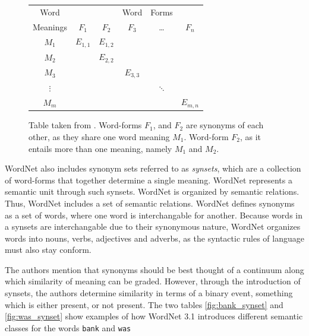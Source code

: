 \documentclass[a4paper,12pt,twoside,openright]{report}
\begin{document}
\begin{figure}
\begin{center}
\begin{tabular}{ | c | c  c  c  c  c | } 
 \hline
 Word        &  &  & Word & Forms &  \\ 
 Meanings & $F_1$ & $F_2$ & $F_3$ & \ldots & $F_n$ \\ 
 \hline
 $M_1$     & $E_{1,1}$ & $E_{1,2}$ &  &  &  \\ 
 $M_2$     &  & $E_{2,2}$ &  &  &  \\ 
 $M_3$     &  &  & $E_{3, 3}$ &  &  \\ 
 $\vdots$ &  &  &  & $\ddots$ &  \\ 
 $M_m$    &  &  &  &  & $E_{m, n}$ \\ 
 \hline
\end{tabular}
\end{center}
\caption{Table taken from \cite{miller90}. Word-forms $F_1$, and $F_2$ are synonyms of each other, as they share one word meaning $M_1$. Word-form $F_2$, as it entails more than one meaning, namely $M_1$ and $M_2$.}
\label{fig:wordnet_table}
\end{figure}

WordNet also includes synonym sets referred to as \textit{synsets}, which are a collection of word-forms that together determine a single meaning.
WordNet represents a semantic unit through such synsets.
WordNet is organized by semantic relations.
Thus, WordNet includes a set of semantic relations.
WordNet defines synonyms as a set of words, where one word is interchangable for another.
Because words in a synsets are interchangable due to their synonymous nature, WordNet organizes words into nouns, verbs, adjectives and adverbs, as the syntactic rules of language must also stay conform.

The authors mention that synonyms should be best thought of a continuum along which similarity of meaning can be graded.
However, through the introduction of synsets, the authors determine similarity in terms of a binary event, something which is either present, or not present.
The two tables \ref{fig:bank_synset} and \ref{fig:was_synset} show examples of how WordNet 3.1 introduces different semantic classes for the words \Verb#bank# and \Verb#was#
\end{document}

